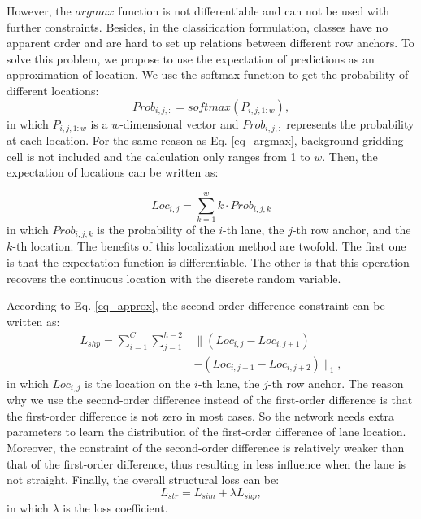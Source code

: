 \documentclass[runningheads]{llncs}
\begin{document}
However, the $argmax$ function is not differentiable and can not be used with further constraints. Besides, in the classification formulation, classes have no apparent order and are hard to set up relations between different row anchors. To solve this problem, we propose to use the expectation of predictions as an approximation of location. We use the softmax function to get the probability of different locations:
\begin{equation}
Prob_{i,j,:} = softmax(P_{i,j,1:w}),
\end{equation}
in which $P_{i,j,1:w}$ is a $w$-dimensional vector and $Prob_{i,j,:}$ represents the probability at each location. For the same reason as Eq. \ref{eq_argmax}, background gridding cell is not included and the calculation only ranges from 1 to $w$. Then, the expectation of locations can be written as: 

\begin{equation}
Loc_{i,j} = \sum_{k=1}^w k \cdot Prob_{i,j,k} 
\label{eq_approx}
\end{equation}
in which $Prob_{i,j,k}$ is the probability of the $i$-th lane, the $j$-th row anchor, and the $k$-th location. The benefits of this localization method are twofold. The first one is that the expectation function is differentiable. The other is that this operation recovers the continuous location with the discrete random variable.

According to Eq. \ref{eq_approx}, the second-order difference constraint can be written as:
\begin{equation}
\begin{split}
L_{shp} = \sum_{i=1}^C \sum_{j=1}^{h-2} & \| (Loc_{i,j} - Loc_{i,j+1}) \\
& - (Loc_{i,j+1} - Loc_{i,j+2}) \|_1,
\end{split}
\end{equation}
in which $Loc_{i,j}$ is the location on the $i$-th lane, the $j$-th row anchor.
The reason why we use the second-order difference instead of the first-order difference is that the first-order difference is not zero in most cases. So the network needs extra parameters to learn the distribution of the first-order difference of lane location. Moreover, the constraint of the second-order difference is relatively weaker than that of the first-order difference, thus resulting in less influence when the lane is not straight. Finally, the overall structural loss can be:
\begin{equation}
L_{str} = L_{sim} + \lambda L_{shp},
\label{eq_str}
\end{equation}
in which $\lambda$ is the loss coefficient.
\end{document}
